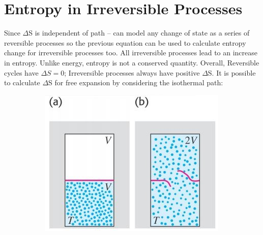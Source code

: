 \documentclass[a4paper, 11pt, normalem]{report}
\begin{document}
\section{Entropy in Irreversible Processes}
Since $\Delta$S is independent of path -- can model any change of state as a series of reversible processes so the previous equation can be used to calculate entropy change for irreversible processes too.
All irreversible processes lead to an increase in entropy.
Unlike energy, entropy is not a conserved quantity.
Overall, Reversible cycles have ${\Delta}S = 0$; Irreversible processes always have positive $\Delta$S.
It is possible to calculate $\Delta$S for free expansion by considering the isothermal path:
\begin{figure}[H]
    \centering
	\begin{subfigure}{0.4\textwidth}
		\includegraphics[width=\textwidth]{Entropy1.jpg}
	\end{subfigure}
	~
	\begin{subfigure}{0.3\textwidth}

\end{subfigure}
\end{figure}
\end{document}
